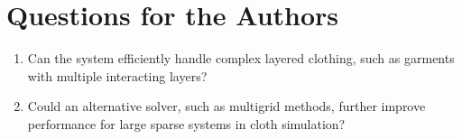 \documentclass[12pt]{article}
\begin{document}
\section{Questions for the Authors}
\begin{enumerate}[noitemsep]
    \item Can the system efficiently handle complex layered clothing, such as garments with multiple interacting layers?
    \item Could an alternative solver, such as multigrid methods, further improve performance for large sparse systems in cloth simulation?
\end{enumerate}
\end{document}
